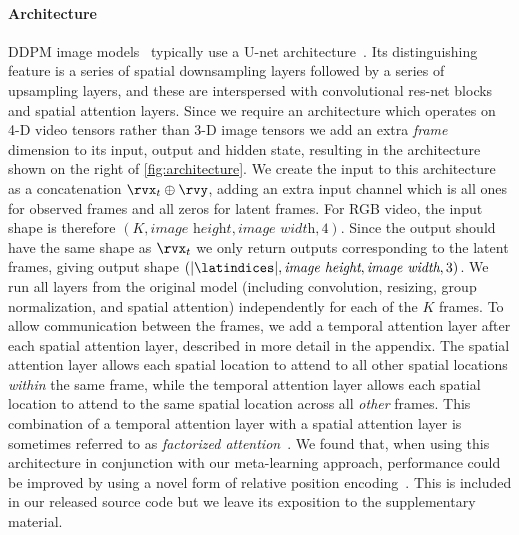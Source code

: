 \paragraph{Architecture}
\label{sec:architecture}
DDPM image models~\citep{ho2020denoising,nichol2021improved} typically use a U-net architecture~\cite{ronneberger2015u}. Its distinguishing feature is a series of spatial downsampling layers followed by a series of upsampling layers, and these are interspersed with convolutional res-net blocks~\cite{he2015deep} and spatial attention layers. Since we require an architecture which operates on 4-D video tensors rather than 3-D image tensors we add an extra \textit{frame} dimension to its input, output and hidden state, resulting in the architecture shown on the right of \cref{fig:architecture}. We create the input to this architecture as a concatenation $\rvx_t \oplus \rvy$, adding an extra input channel which is all ones for observed frames and all zeros for latent frames. For RGB video, the input shape is therefore $(K, \textit{image height}, \textit{image width}, 4)$. Since the output should have the same shape as $\rvx_t$ we only return outputs corresponding to the latent frames, giving output shape  $(|\latindices|, \textit{image height}, \textit{image width}, 3)$. We run all layers from the original model (including convolution, resizing, group normalization, and spatial attention) independently for each of the $K$ frames.
To allow communication between the frames, we add a temporal attention layer after each spatial attention layer, described in more detail in the appendix. 
%
The spatial attention layer allows each spatial location to attend to all other spatial locations \textit{within} the same frame, while the temporal attention layer allows each spatial location to attend to the same spatial location across all \textit{other} frames.
%
This combination of a temporal attention layer with a spatial attention layer is sometimes referred to as \textit{factorized attention}~\citep{tashiro2021csdi,ho2022video}. We found that, when using this architecture in conjunction with our meta-learning approach, performance could be improved by using a novel form of relative position encoding~\cite{shaw2018self,wu2021rethinking}. This is included in our released source code but we leave its exposition to the supplementary material.

